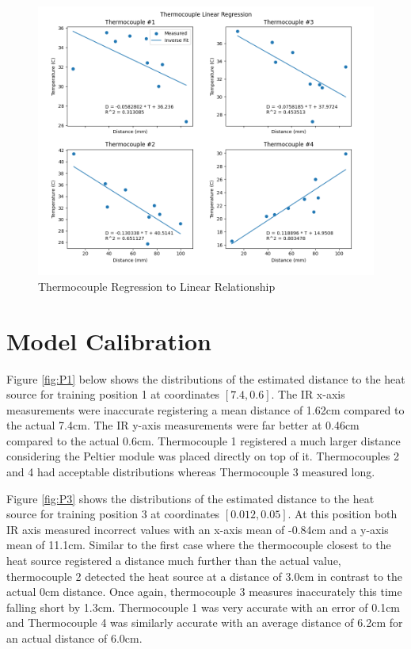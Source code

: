 \documentclass[12pt]{article}
\begin{document}
\begin{figure}[H]
    \centering
    \includegraphics[width=\linewidth]{images/Thermocouple Sensor Fits.png}
    \caption{Thermocouple Regression to Linear Relationship}
    \label{fig:fit-tc} %
\end{figure}


\section{Model Calibration}

Figure \ref{fig:P1} below shows the distributions of the estimated distance to the heat source for training position 1 at coordinates $[7.4, 0.6]$. The IR x-axis measurements were inaccurate registering a mean distance of 1.62cm compared to the actual 7.4cm. The IR y-axis measurements were far better at 0.46cm compared to the actual 0.6cm. Thermocouple 1 registered a much larger distance considering the Peltier module was placed directly on top of it. Thermocouples 2 and 4 had acceptable distributions whereas Thermocouple 3 measured long.

Figure \ref{fig:P3} shows the distributions of the estimated distance to the heat source for training position 3 at coordinates $[0.012, 0.05]$. At this position both IR axis measured incorrect values with an x-axis mean of -0.84cm and a y-axis mean of 11.1cm. Similar to the first case where the thermocouple closest to the heat source registered a distance much further than the actual value, thermocouple 2 detected the heat source at a distance of 3.0cm in contrast to the actual 0cm distance. Once again, thermocouple 3 measures inaccurately this time falling short by 1.3cm. Thermocouple 1 was very accurate with an error of 0.1cm and Thermocouple 4 was similarly accurate with an average distance of 6.2cm for an actual distance of 6.0cm.
\end{document}
